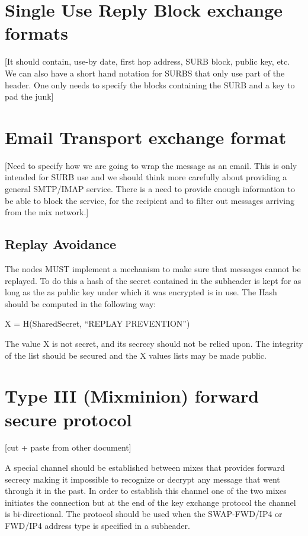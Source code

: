 \section{Single Use Reply Block exchange formats}

[It should contain, use-by date, first hop address, 
 SURB block, public key, etc.
 We can also have a short hand notation for SURBS that only
 use part of the header. One only needs to specify the 
 blocks containing the SURB and a key to pad the junk]

\section{Email Transport exchange format}

[Need to specify how we are going to wrap the message
 as an email. This is only intended for SURB use and
 we should think more carefully about providing a 
 general SMTP/IMAP service.
 There is a need to provide enough information to be 
 able to block the service, for the recipient and to
 filter out messages arriving from the mix network.]

\subsection{Replay Avoidance}

The nodes MUST implement a mechanism to make sure that messages cannot
be replayed. To do this a hash of the secret contained in the
subheader is kept for as long as the as public key under which it was
encrypted is in use. The Hash should be computed in the following way:

X = H(SharedSecret, ``REPLAY PREVENTION'')

The value X is not secret, and its secrecy should not be relied upon.
The integrity of the list should be secured and the X values lists may
be made public.

\section{Type III (Mixminion) forward secure protocol}

[cut + paste from other document]

A special channel should be established between mixes that provides
forward secrecy making it impossible to recognize or decrypt any
message that went through it in the past. In order to establish this
channel one of the two mixes initiates the connection but at the end
of the key exchange protocol the channel is bi-directional. The
protocol should be used when the SWAP-FWD/IP4 or FWD/IP4 address type
is specified in a subheader.

